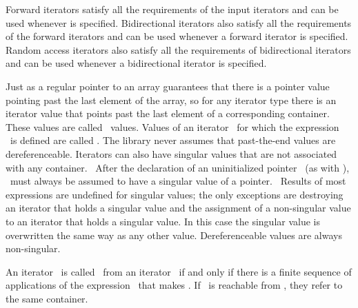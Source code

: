 \documentclass[american,twoside]{book}
\newcommand{\resetcolor}{\textcolor{addclr}{}}
\begin{document}
\begin{paras}
\pnum
Forward iterators satisfy all the requirements of the input
 iterators and can be used whenever 
 is specified.
Bidirectional iterators also satisfy all the requirements of the
forward iterators and can be used whenever a forward iterator is specified.
Random access iterators also satisfy all the requirements of bidirectional
iterators and can be used whenever a bidirectional iterator is specified.

\pnum
{}

\pnum
\resetcolor{}Just as a regular pointer to an array guarantees that there is a pointer value pointing past the last element
of the array, so \textcolor{black}{}for any iterator type there is an iterator value that points past the last element of a
corresponding container.
These values are called
\ 
values.
Values of an iterator
\
for which the expression
\
is defined are called
.
The library never assumes that past-the-end values are dereferenceable.
Iterators can also have singular values that are not associated with any
container.
\enterexample\ 
After the declaration of an uninitialized pointer
\tcode{x}\
(as with
),
\tcode{x}\
must always be assumed to have a singular value of a pointer.
\exitexample\ 
Results of most expressions are undefined for singular values;
the only exceptions are destroying an iterator that holds a singular value
and the assignment of a non-singular value to
an iterator that holds a singular value.
In this case the singular
value is overwritten the same way as any other value.
Dereferenceable
values are always non-singular.

\pnum
An iterator
\
is called
\techterm{reachable}\ 
from an iterator
\
if and only if there is a finite sequence of applications of
the expression
\
that makes
.
If
\tcode{j}\
is reachable from
\tcode{i},
they refer to the same container.


\end{paras}
\end{document}
